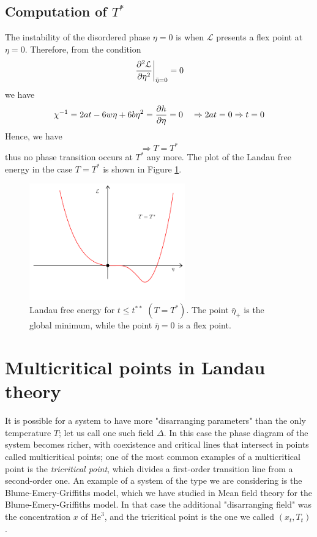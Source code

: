 \documentclass[../../Main/Main.tex]{subfiles}
\begin{document}
\subsection{Computation of \( T^* \)}
The instability of the disordered phase \( \eta =0 \) is when \( \mathcal{L} \) presents a flex point at \( \eta =0 \). Therefore, from the condition
\begin{equation*}
    \eval{\pdv[2]{\mathcal{L}}{\eta }}_{\bar{\eta } = 0 } = 0
\end{equation*}
we have
\begin{equation*}
  \chi ^{-1} = 2 a t - 6 w \eta + 6b \eta ^2 = \pdv{h}{\eta } = 0 \quad \Rightarrow
  2 a t = 0 \Rightarrow t=0
\end{equation*}
Hence, we have
\begin{equation}
\Rightarrow T = T^*
\end{equation}
thus no phase transition occurs at \( T^* \) any more. The plot of the Landau free energy in the case \( T=T^* \) is shown in Figure \ref{fig:16_6}.

\begin{figure}[H]
\centering
\includegraphics[width=0.6\textwidth]{./img/6.pdf}
\caption{\label{fig:16_6} Landau free energy for \( t\le t^{**} \) \( ( T =T^* ) \). The point \( \bar{\eta }_+   \) is the global minimum, while the point \( \bar{\eta }  = 0  \) is a flex point.}
\end{figure}





\section{Multicritical points in Landau theory}
It is possible for a system to have more "disarranging parameters" than the only temperature \( T \); let us call one such field \( \Delta  \). In this case the phase diagram of the system becomes richer, with coexistence and critical lines that intersect in points called multicritical points; one of the most common examples of a multicritical point is the \emph{tricritical point}, which divides a first-order transition line from a second-order one. An example of a system of the type we are considering is the Blume-Emery-Griffiths model, which we have studied in Mean field theory for the Blume-Emery-Griffiths model. In that case the additional "disarranging field" was the concentration \( x \)  of \( \text{He}^3 \), and the tricritical point is the one we called \( (x_t,T_t) \).
\end{document}
